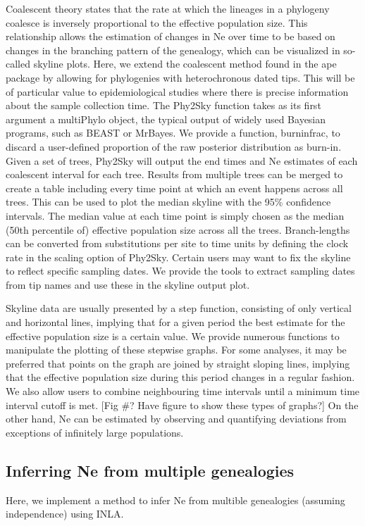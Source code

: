 \documentclass[english,titlepage]{article}
\begin{document}
Coalescent theory states that the rate at which the lineages in a phylogeny coalesce is inversely proportional to the effective population size. This relationship allows the estimation of changes in Ne over time to be based on changes in the branching pattern of the genealogy, which can be visualized in so-called skyline plots. Here, we extend the coalescent method found in the ape package \citep{Paradis2004} by allowing for phylogenies with heterochronous dated tips. This will be of particular value to epidemiological studies where there is precise information about the sample collection time.
The Phy2Sky function takes as its first argument a multiPhylo object, the typical output of widely used Bayesian programs, such as BEAST or MrBayes. We provide a function, burninfrac, to discard a user-defined proportion of the raw posterior distribution as burn-in. Given a set of trees, Phy2Sky will output the end times and Ne estimates of each coalescent interval for each tree. Results from multiple trees can be merged to create a table including every time point at which an event happens across all trees. This can be used to plot the median skyline with the 95\% confidence intervals. The median value at each time point is simply chosen as the median (50th percentile of) effective population size across all the trees. 
Branch-lengths can be converted from substitutions per site to time units by defining the clock rate in the scaling option of Phy2Sky. Certain users may want to fix the skyline to reflect specific sampling dates. We provide the tools to extract sampling dates from tip names and use these in the skyline output plot.

Skyline data are usually presented by a step function, consisting of only vertical and horizontal lines, implying that for a given period the best estimate for the effective population size is a certain value. We provide numerous functions to manipulate the plotting of these stepwise graphs. For some analyses, it may be preferred that points on the graph are joined by straight sloping lines, implying that the effective population size during this period changes in a regular fashion. We also allow users to combine neighbouring time intervals until a minimum time interval cutoff is met. [Fig \#? Have figure to show these types of graphs?] 
On the other hand, Ne can be estimated by observing and quantifying deviations from exceptions of infinitely large populations. 
  
\subsection{Inferring Ne from multiple genealogies}
Here, we implement a method to infer Ne from multible genealogies (assuming independence) using INLA.
\end{document}
